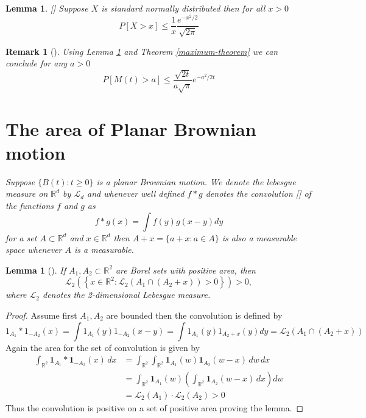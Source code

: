 \documentclass[11pt, a4paper, oneside]{report}
\numberwithin{equation}{section}
\newtheorem{lemma}[theorem]{Lemma}
\newtheorem{remark}[theorem]{Remark}
\begin{document}
\begin{lemma}\label{normal}[{\cite[Lemma 12.9]{PeresMortersBook}}]
Suppose \(X\) is standard normally distributed then for all \(x>0\)
\[
P[X>x] \leq \frac{1}{x} \frac{e^{-x^2/2}}{\sqrt{2\pi}}
\]
\end{lemma}
\begin{remark}[{\cite[Remark 2.22]{PeresMortersBook}}]
Using Lemma \ref{normal} and Theorem \ref{maximum-theorem} we can conclude for any \(a>0\)
\[
P[M(t)>a] \leq \frac{\sqrt{2t}}{a \sqrt{\pi}} {e^{-a^2/2t}}
\]
\section{The area of Planar Brownian motion}
Suppose \(\{B(t) : t\geq 0\}\) is a planar Brownian motion. We denote the lebesgue measure on \(\mathbb{R}^d\) by \(\mathcal{L}_d\) and whenever well defined \(f * g\) denotes the convolution [{\cite[Definition 14.20]{MR4201399}}] of the functions \(f\) and \(g\) as
\[
f*g(x)=\int f(y) g(x-y)dy
\]
for a set \(A \subset \mathbb{R}^d\) and \(x \in \mathbb{R}^d\) then \(A+x=\{a+x : a \in A\}\) is also a measurable space whenever \(A\) is a measurable.
\end{remark}
\begin{lemma}[{\cite[Lemma 2.23]{PeresMortersBook}}]
If \( A_1, A_2 \subset \mathbb{R}^2 \) are Borel sets with positive area, then
\[
\mathcal{L}_2\left( \left\{ x \in \mathbb{R}^2 : \mathcal{L}_2\left( A_1 \cap (A_2 + x) \right) > 0 \right\} \right) > 0,
\]
where \( \mathcal{L}_2 \) denotes the 2-dimensional Lebesgue measure.
\end{lemma}
\begin{proof}
Assume first \(A_1,A_2\) are bounded then the convolution is defined by 
\[
1_{A_1}*1_{-A_2}(x) = \int 1_{A_1}(y)1_{-A_2}(x-y)=\int 1_{A_1}(y)1_{A_2+x}(y)dy= \mathcal{L}_2(A_1 \cap (A_2+x))
\]
Again the area for the set of convolution is given by 
\begin{align*}
\int_{\mathbb{R}^2} \mathbf{1}_{A_1} * \mathbf{1}_{-A_2}(x) \, dx 
&= \int_{\mathbb{R}^2} \int_{\mathbb{R}^2} \mathbf{1}_{A_1}(w) \mathbf{1}_{A_2}(w - x) \, dw \, dx \\
&= \int_{\mathbb{R}^2} \mathbf{1}_{A_1}(w) \left( \int_{\mathbb{R}^2} \mathbf{1}_{A_2}(w - x) \, dx \right) dw \\
&= \mathcal{L}_2(A_1) \cdot \mathcal{L}_2(A_2) > 0
\end{align*}
Thus the convolution is positive on a set of positive area proving the lemma.

\end{proof}
\end{document}
